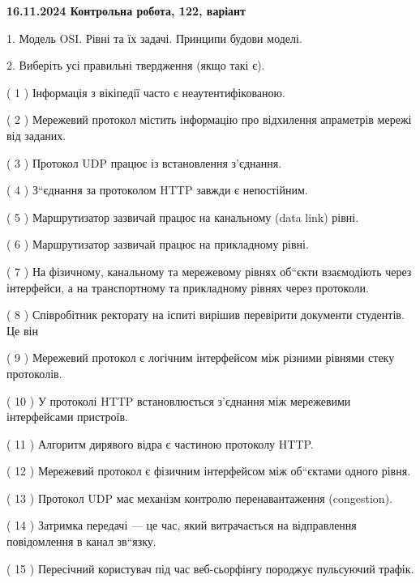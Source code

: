 \documentclass[12pt, ukrainian]{article}
\begin{document}
\vspace{4mm}
\newpage
\begin {large}

\textbf{16.11.2024 Контрольна робота, 122, варіант  }\par


{
1. Модель OSI. Рівні та їх задачі. Принципи будови моделі.



\vspace{5mm}
2. Виберіть усі правильні твердження (якщо такі є).\par
\vspace{2mm}

( 1 ) Інформація з вікіпедії часто є неаутентифікованою.

( 2 ) Мережевий протокол містить інформацію про відхилення апраметрів мережі від заданих.

( 3 ) Протокол UDP працює із встановлення з'єднання.

( 4 ) З“єднання за протоколом  HTTP завжди є непостійним.

( 5 ) Маршрутизатор зазвичай працює на канальному (data link) рівні.

( 6 ) Маршрутизатор зазвичай працює на прикладному рівні.

( 7 ) На фізичному, канальному та мережевому рівнях об“єкти взаємодіють через інтерфейси, а на транспортному та прикладному рівнях через протоколи.

( 8 ) Співробітник ректорату на іспиті вирішив перевірити документи студентів. Це він

( 9 ) Мережевий протокол є логічним інтерфейсом між різними рівнями стеку протоколів.

( 10 ) У протоколі HTTP встановлюється з'єднання між мережевими інтерфейсами пристроїв.

( 11 ) Алгоритм дирявого відра є частиною протоколу HTTP.

( 12 ) Мережевий протокол є фізичним інтерфейсом між об“єктами одного рівня.

( 13 ) Протокол UDP має механізм контролю перенавантаження (congestion).

( 14 ) Затримка передачі — це час, який витрачається на відправлення повідомлення в канал зв“язку.

( 15 ) Пересічний користувач під час веб-сьорфінгу породжує пульсуючий трафік.
}
\end {large}
\end{document}
